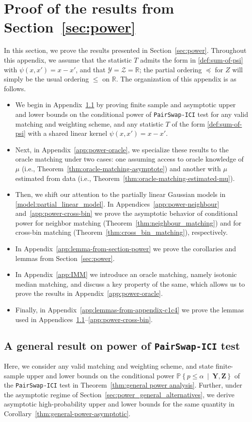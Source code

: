 \documentclass[12pt]{article}
\newcommand{\R}{\mathbb{R}}
\newcommand{\PPst}[2]{\mathbb{P}\left\{{#1}\  \middle| \ {#2}\right\}}
\newcommand{\Ycal}{\mathcal{Y}}
\newcommand{\Zcal}{\mathcal{Z}}
\newcommand{\bY}{\mathbf{Y}}
\newcommand{\bZ}{\mathbf{Z}}
\begin{document}
\section{Proof of the results from Section~\ref{sec:power}}
In this section, we prove the results presented in Section~\ref{sec:power}. Throughout this appendix, we assume that the statistic $T$ admits the form in \eqref{def:sum-of-psi} with $\psi(x,x') = x-x'$, and that $\Ycal=\Zcal=\R$; the partial ordering $\preceq$ for $Z$ will simply be the usual ordering $\leq$ on $\R$. The organization of this appendix is as follows.
\begin{itemize}
    \item We begin in Appendix~\ref{app:general_power} by proving finite sample and asymptotic upper and lower bounds on the conditional power of \textnormal{\texttt{PairSwap-ICI}} test for any valid matching and weighting scheme, and  any statistic $T$ of the form \eqref{def:sum-of-psi} with a shared linear kernel $\psi(x,x')=x-x'$.
    \item Next, in Appendix~\ref{app:power-oracle}, we specialize these results to the oracle matching under two cases: one assuming access to oracle knowledge of $\mu$ (i.e., Theorem~\ref{thm:oracle-matching-asymptote}) and another with $\mu$ estimated from data (i.e., Theorem~\ref{thm:oracle-matching-estimated-mu}).
    \item Then, we shift our attention to the partially linear Gaussian models in \eqref{model:partial_linear_model}. In Appendices~\ref{app:power-neighbour} and~\ref{app:power-cross-bin} we prove the asymptotic behavior of conditional power for neighbor matching (Theorem~\ref{thm:neighbour_matching}) and for cross-bin matching (Theorem~\ref{thm:cross_bin_matching}), respectively.
    \item In Appendix~\ref{app:lemma-from-section-power} we prove the corollaries and lemmas from Section~\ref{sec:power}.
    \item In Appendix~\ref{app:IMM} we introduce an oracle matching, namely isotonic median matching, and discuss a key property of the same, which allows us to prove the results in Appendix~\ref{app:power-oracle}.
    \item Finally, in Appendix~\ref{app:lemmas-from-appendix-c1c4} we prove the lemmas used in Appendices~\ref{app:general_power}--\ref{app:power-cross-bin}.
\end{itemize}

\subsection{A general result on power of \textnormal{\texttt{PairSwap-ICI}} test}\label{app:general_power}
Here, we consider any valid matching and weighting scheme, and state finite-sample upper and lower bounds on the conditional power $\PPst{p\leq\alpha}{\bY,\bZ}$ of the \textnormal{\texttt{PairSwap-ICI}} test in Theorem~\ref{thm:general power analysis}. Further, under the asymptotic regime of Section~\ref{sec:power_general_alternatives}, we derive asymptotic high-probability upper and lower bounds for the same quantity in Corollary~\ref{thm:general-power-asymptotic}. 
\end{document}
